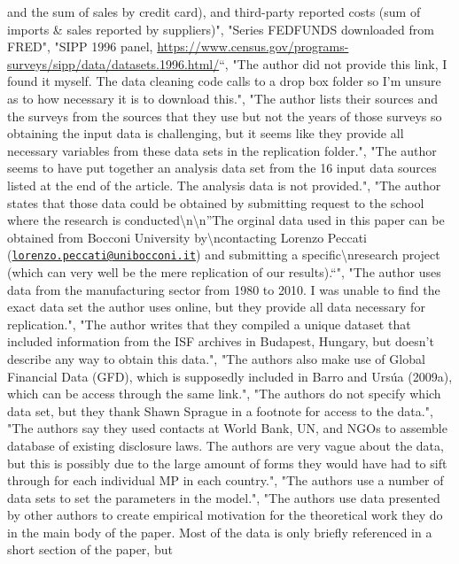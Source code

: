 \documentclass[]{article}
\begin{document}
\begin{itemize}
  and the sum of sales by credit card), and third-party reported costs
  (sum of imports \& sales reported by suppliers)", "Series FEDFUNDS
  downloaded from FRED", "SIPP 1996 panel,
  \url{https://www.census.gov/programs-surveys/sipp/data/datasets.1996.html/}``,
  "The author did not provide this link, I found it myself. The data
  cleaning code calls to a drop box folder so I'm unsure as to how
  necessary it is to download this.", "The author lists their sources
  and the surveys from the sources that they use but not the years of
  those surveys so obtaining the input data is challenging, but it seems
  like they provide all necessary variables from these data sets in the
  replication folder.", "The author seems to have put together an
  analysis data set from the 16 input data sources listed at the end of
  the article. The analysis data is not provided.", "The author states
  that those data could be obtained by submitting request to the school
  where the research is conducted\textbackslash{}n\textbackslash{}n''The
  orginal data used in this paper can be obtained from Bocconi
  University by\textbackslash{}ncontacting Lorenzo Peccati
  (\href{mailto:lorenzo.peccati@unibocconi.it}{\nolinkurl{lorenzo.peccati@unibocconi.it}})
  and submitting a specific\textbackslash{}nresearch project (which can
  very well be the mere replication of our results).``", "The author
  uses data from the manufacturing sector from 1980 to 2010. I was
  unable to find the exact data set the author uses online, but they
  provide all data necessary for replication.", "The author writes that
  they compiled a unique dataset that included information from the ISF
  archives in Budapest, Hungary, but doesn't describe any way to obtain
  this data.", "The authors also make use of Global Financial Data
  (GFD), which is supposedly included in Barro and Ursúa (2009a), which
  can be access through the same link.", "The authors do not specify
  which data set, but they thank Shawn Sprague in a footnote for access
  to the data.", "The authors say they used contacts at World Bank, UN,
  and NGOs to assemble database of existing disclosure laws. The authors
  are very vague about the data, but this is possibly due to the large
  amount of forms they would have had to sift through for each
  individual MP in each country.", "The authors use a number of data
  sets to set the parameters in the model.", "The authors use data
  presented by other authors to create empirical motivation for the
  theoretical work they do in the main body of the paper. Most of the
  data is only briefly referenced in a short section of the paper, but

\end{itemize}
\end{document}

